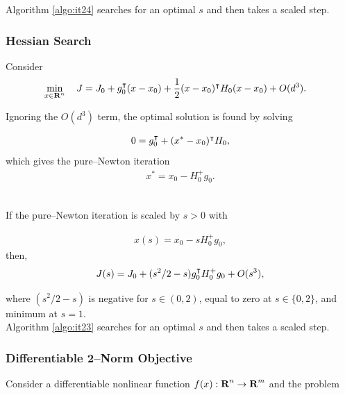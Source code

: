 \documentclass{article}
\begin{document}
    Algorithm \ref{algo:it24} searches for an optimal $s$ and then takes a scaled step.


\subsubsection{Hessian Search}

    Consider
    \begin{align*}
        \min_{x\in\textbf{R}^n}\quad J&=J_0 + g_0^\intercal(x-x_0)+\frac{1}{2} (x-x_0)^\intercal H_0 (x-x_0)+ O(d^3).
    \end{align*}

    Ignoring the $O(d^3)$ term, 
    the optimal solution is found by solving

    \begin{align*}
        0 = g_0^\intercal + (x^*-x_0)^\intercal H_0,
    \end{align*}
    which gives the pure--Newton iteration
    \begin{align*}
        x^*=x_0-H_0^+g_0.
    \end{align*}

    \\
    If the pure--Newton iteration is scaled by $s>0$ with

    \begin{align*}
        x(s)=x_0-sH_0^+g_0,
    \end{align*}
    then,
    \begin{align*}
        J(s) = J_0 +(s^2/2-s)g_0^\intercal H_0^+ g_0+O(s^3),
    \end{align*}

    where $(s^2/2-s)$ is negative for $s\in(0,2)$, 
    equal to zero at $s\in\{0,2\}$, 
    and minimum at $s=1$.\\
    Algorithm \ref{algo:it23} searches for an optimal $s$ and then takes a scaled step.

\subsubsection{Differentiable 2--Norm Objective}

    Consider a differentiable nonlinear function $f(x):\textbf{R}^n\to\textbf{R}^m$ and the problem 
\end{document}
